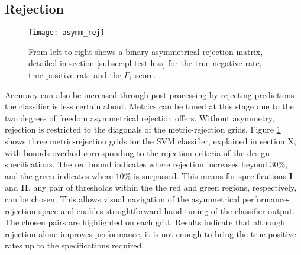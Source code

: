     \subsection{Rejection}
    \label{subsec:exp-postproc-rej}
        \begin{figure}[ht]
            \centering
            \texttt{[image: asymm\_rej]}
            \caption{From left to right shows a binary asymmetrical rejection matrix, detailed in section \ref{subsec:pl-test-less} for the true negative rate, true positive rate and the $F_1$ score.}
            \label{fig:exp-postproc-asymrej}
        \end{figure}
        Accuracy can also be increased through post-processing by rejecting predictions the classifier is less certain about. Metrics can be tuned at this stage due to the two degrees of freedom asymmetrical rejection offers. Without asymmetry, rejection is restricted to the diagonals of the metric-rejection grids. Figure \ref{fig:exp-postproc-asymrej} shows three metric-rejection grids for the SVM classifier, explained in section X, with bounds overlaid corresponding to the rejection criteria of the design specifications. The red bound indicates where rejection increases beyond $30\%$, and the green indicates where $10\%$ is surpassed. This means for specifications \textbf{I} and \textbf{II}, any pair of thresholds within the the red and green regions, respectively, can be chosen. This allows visual navigation of the asymmetrical performance-rejection space and enables straightforward hand-tuning of the classifier output. The chosen pairs are highlighted on each grid. Results indicate that although rejection alone improves performance, it is not enough to bring the true positive rates up to the specifications required.
    
